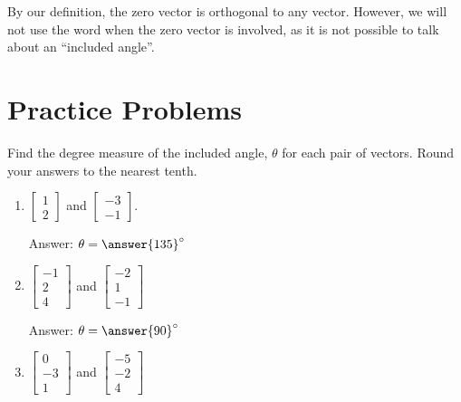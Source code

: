 \documentclass{ximera}
\begin{document}
\begin{remark}  By our definition, the zero vector is orthogonal to any vector.  However, we will not use the word  when the zero vector is involved, as it is not possible to talk about an ``included angle''.
\end{remark}


\section*{Practice Problems}
 \begin{problem}\label{prob:anglebetweenvectors1}
Find the degree measure of the included angle, $\theta$ for each pair of vectors.  Round your answers to the nearest tenth.
  \begin{enumerate}

\item
  $\begin{bmatrix}1\\2\end{bmatrix}$ and $\begin{bmatrix}-3\\-1\end{bmatrix}$.
  
  Answer: $\theta=\answer{135}^\circ$
  
\item
  $\begin{bmatrix}-1\\2\\4\end{bmatrix}$ and $\begin{bmatrix}-2\\1\\-1\end{bmatrix}$
  
   Answer: $\theta=\answer{90}^\circ$

\item
  $\begin{bmatrix}0\\-3\\1\end{bmatrix}$ and $\begin{bmatrix}-5\\-2\\4\end{bmatrix}$
  

\end{enumerate}
\end{problem}
\end{document}
